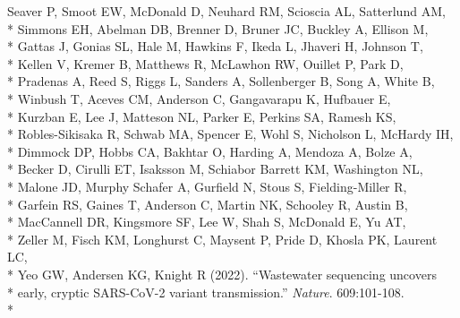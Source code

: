 \documentclass[margin,line]{res}
\begin{document}
\begin{resume}
\hspace*{9.5mm} Seaver P, Smoot EW, McDonald D, Neuhard RM, Scioscia AL, Satterlund AM,\\*
\hspace*{9.5mm} Simmons EH, Abelman DB, Brenner D, Bruner JC, Buckley A, Ellison M,\\*
\hspace*{9.5mm} Gattas J, Gonias SL, Hale M, Hawkins F, Ikeda L, Jhaveri H, Johnson T,\\*
\hspace*{9.5mm} Kellen V, Kremer B, Matthews R, McLawhon RW, Ouillet P, Park D,\\*
\hspace*{9.5mm} Pradenas A, Reed S, Riggs L, Sanders A, Sollenberger B, Song A, White B,\\*
\hspace*{9.5mm} Winbush T, Aceves CM, Anderson C, Gangavarapu K, Hufbauer E,\\*
\hspace*{9.5mm} Kurzban E, Lee J, Matteson NL, Parker E, Perkins SA, Ramesh KS,\\*
\hspace*{9.5mm} Robles-Sikisaka R, Schwab MA, Spencer E, Wohl S, Nicholson L, McHardy IH,\\*
\hspace*{9.5mm} Dimmock DP, Hobbs CA, Bakhtar O, Harding A, Mendoza A, Bolze A,\\*
\hspace*{9.5mm} Becker D, Cirulli ET, Isaksson M, Schiabor Barrett KM, Washington NL,\\*
\hspace*{9.5mm} Malone JD, Murphy Schafer A, Gurfield N, Stous S, Fielding-Miller R,\\*
\hspace*{9.5mm} Garfein RS, Gaines T, Anderson C, Martin NK, Schooley R, Austin B,\\*
\hspace*{9.5mm} MacCannell DR, Kingsmore SF, Lee W, Shah S, McDonald E, Yu AT,\\*
\hspace*{9.5mm} Zeller M, Fisch KM, Longhurst C, Maysent P, Pride D, Khosla PK, Laurent LC,\\*
\hspace*{9.5mm} Yeo GW, Andersen KG, Knight R (2022). ``Wastewater sequencing uncovers\\*
\hspace*{9.5mm} early, cryptic SARS-CoV-2 variant transmission.'' \textit{Nature}. 609:101-108.\\*\vspace{2mm}

\end{resume}
\end{document}
